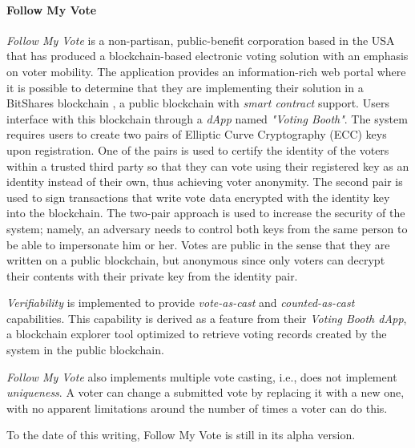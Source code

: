 \documentclass[../access.tex]{subfiles}
\begin{document}
	\paragraph{Follow My Vote \cite{Ernest2021}} 
        \textit{Follow My Vote} is a non-partisan, public-benefit corporation based in the USA that has produced a blockchain-based electronic voting solution with an emphasis on voter mobility. The application provides an information-rich web portal \cite{Ernest2021} where it is possible to determine that they are implementing their solution in a BitShares blockchain \cite{BitShares2023}, a public blockchain with \textit{smart contract} support. Users interface with this blockchain through a \textit{dApp} named \textit{"Voting Booth"}. The system requires users to create two pairs of Elliptic Curve Cryptography (ECC) keys upon registration. One of the pairs is used to certify the identity of the voters within a trusted third party so that they can vote using their registered key as an identity instead of their own, thus achieving voter anonymity. The second pair is used to sign transactions that write vote data encrypted with the identity key into the blockchain. The two-pair approach is used to increase the security of the system; namely, an adversary needs to control both keys from the same person to be able to impersonate him or her. Votes are public in the sense that they are written on a public blockchain, but anonymous since only voters can decrypt their contents with their private key from the identity pair.
		\par
        \textit{Verifiability} is implemented to provide \textit{vote-as-cast} and \textit{counted-as-cast} capabilities. This capability is derived as a feature from their \textit{Voting Booth dApp}, a blockchain explorer tool optimized to retrieve voting records created by the system in the public blockchain.
		\par
        \textit{Follow My Vote} also implements multiple vote casting, i.e., does not implement \textit{uniqueness}. A voter can change a submitted vote by replacing it with a new one, with no apparent limitations around the number of times a voter can do this.
		\par
		To the date of this writing, Follow My Vote is still in its alpha version.
	
\end{document}

